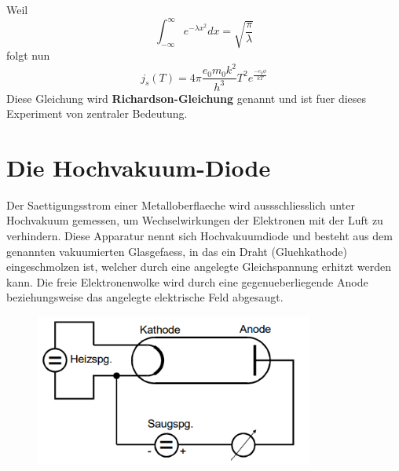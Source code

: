 Weil 
\begin{equation}
    \int_{-\infty}^{\infty}e^{-\lambda x^2}dx=\sqrt{\frac{\pi}{\lambda}}\nonumber
\end{equation}
folgt nun
\begin{equation}
    j_s(T)=4\pi\frac{e_0m_0k^2}{h^3}T^2e^{\frac{-e_0\phi}{kT}} \label{7}
\end{equation}
Diese Gleichung wird \textbf{Richardson-Gleichung} genannt und ist fuer dieses Experiment von zentraler Bedeutung.
\section{Die Hochvakuum-Diode}
Der Saettigungsstrom einer Metalloberflaeche wird aussschliesslich unter Hochvakuum gemessen, um Wechselwirkungen der Elektronen mit der Luft zu verhindern. Diese Apparatur nennt sich Hochvakuumdiode und besteht aus dem genannten vakuumierten Glasgefaess, in das ein Draht (Gluehkathode) eingeschmolzen ist, welcher durch eine angelegte Gleichspannung erhitzt werden kann. Die freie Elektronenwolke wird durch eine gegenueberliegende Anode beziehungsweise das angelegte elektrische Feld abgesaugt. 
\begin{figure}[H]
    \centering
    \captionsetup{justification=centering}
    \includegraphics[height=5cm]{"Schema_emission.png"}
    \label{Fig:Schema}
\end{figure}
